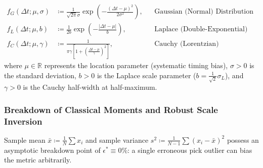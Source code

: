 \begin{align}
  f_G(\Delta t; \mu, \sigma)
  &\coloneqq \frac{1}{\sqrt{2\pi}\sigma} \exp\left(-\frac{(\Delta t
  - \mu)^2}{2\sigma^2}\right),
  && \text{Gaussian (Normal) Distribution} \label{eq:supp_pdf_gaussian} \\
  f_L(\Delta t; \mu, b)
  &\coloneqq \frac{1}{2b} \exp\left(-\frac{|\Delta t - \mu|}{b}\right),
  && \text{Laplace (Double-Exponential) Distribution}
  \label{eq:supp_pdf_laplace} \\
  f_C(\Delta t; \mu, \gamma)
  &\coloneqq \frac{1}{\pi \gamma \left[1 + \left(\frac{\Delta t -
  \mu}{\gamma}\right)^2\right]},
  && \text{Cauchy (Lorentzian) Distribution} \label{eq:supp_pdf_cauchy}
\end{align}
where $\mu \in \mathbb{R}$ represents the location parameter
(systematic timing bias),
$\sigma > 0$ is the standard deviation, $b > 0$ is the Laplace scale
parameter ($b = \frac{1}{\sqrt{2}}\sigma_L$),
and $\gamma > 0$ is the Cauchy half-width at half-maximum.

\subsubsection*{Breakdown of Classical Moments and Robust Scale Inversion}
Sample mean $\bar{x} \coloneqq \frac{1}{N} \sum x_i$ and sample variance
$s^2 \coloneqq \frac{1}{N-1} \sum (x_i - \bar{x})^2$ possess an
asymptotic breakdown
point of $\epsilon^* \equiv \num{0}\%$: a single erroneous pick
outlier can bias the metric
arbitrarily.

